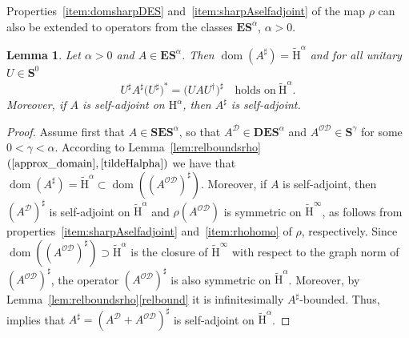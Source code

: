 \documentclass[10pt]{amsart}
\newtheorem{lemm}[theo]{Lemma}\newtheorem{prop}[theo]{Proposition}\newtheorem{coro}[theo]{Corollary}\newtheorem{conj}[theo]{Conjecture}
\theoremstyle{definition}\newtheorem{defi}[theo]{Definition}\newtheorem{rema}[theo]{Remark}\newtheorem{exam}[theo]{Example}\newtheorem{nota}[theo]{Notation}
\DeclareMathOperator{\dom}{dom}
\renewcommand{\mathsf}{\mathrm}
\newcommand{\sfH}{\mathsf{H}}
\newcommand{\CD}{\mathcal{D}}
\newcommand{\CO}{\mathcal{O}}
\newcommand{\BD}{\mathbf D}
\newcommand{\BE}{\mathbf E}
\newcommand{\BS}{\mathbf S}
\renewcommand{\subseteq}{\subset}
\renewcommand{\supseteq}{\supset}
\begin{document}
Properties~\eqref{item:domsharpDES} and~\eqref{item:sharpAselfadjoint} of the map $\rho$ can also be extended to operators from the classes $\BE\BS^\alpha$, $\alpha>0$.
\begin{lemm}\label{lem:sharpWES}
Let $\alpha>0$ and $A\in\BE\BS^\alpha$. Then $\dom(A^\sharp)=\widetilde{\sfH}^\alpha$ and for all unitary $U\in\BS^0$
\begin{equation}\label{eq:Usharp*AsharpUsharp}
U^\sharp A^\sharp \big(U^\sharp\big)^* = \big(U A U^\dagger\big)^\sharp \quad \text{holds on} \ \widetilde{\sfH}^\alpha.
\end{equation}
Moreover, if $A$ is self-adjoint on $\sfH^\alpha$, then $A^\sharp$ is self-adjoint.
\end{lemm}

\begin{proof}
Assume first that $A\in\BS\BE\BS^\alpha$, so that $A^\CD\in\BD\BE\BS^\alpha$ and $A^{\CO\CD}\in\BS^\gamma$ for some $0<\gamma<\alpha$. According to Lemma~\ref{lem:relboundsrho}$(\ref{approx_domain}, \ref{tildeHalpha})$ we have that $\dom(A^\sharp)=\widetilde{\sfH}^\alpha\subseteq\dom((A^{\CO\CD})^\sharp)$. Moreover, if $A$ is self-adjoint, then $(A^\CD)^\sharp$ is self-adjoint on $\widetilde{\sfH}^\alpha$ and $\rho(A^{\CO\CD})$ is symmetric on $\widetilde{\sfH}^\infty$, as follows from properties~\eqref{item:sharpAselfadjoint} and~\eqref{item:rhohomo} of $\rho$, respectively. Since $\dom((A^{\CO\CD})^\sharp)\supseteq\widetilde{\sfH}^\alpha$ is the closure of $\widetilde{\sfH}^\infty$ with respect to the graph norm of $(A^{\CO\CD})^\sharp$, the operator $(A^{\CO\CD})^\sharp$ is also symmetric on $\widetilde{\sfH}^\alpha$. Moreover, by Lemma~\ref{lem:relboundsrho}\eqref{relbound} it is infinitesimally $A^\sharp$-bounded. Thus, \cite[Theorem~4.1.9]{BirmanSolomyak} implies that $A^\sharp=(A^\CD +A^{\CO\CD})^\sharp$ is self-adjoint on $\widetilde{\sfH}^\alpha$.


\end{proof}
\end{document}
